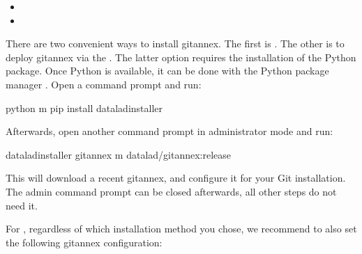 \begin{description}
\begin{itemize}
\item {} 
\sphinxAtStartPar
{}

\item {} 
\sphinxAtStartPar
{}

\end{itemize}

\ignorespaces 
\sphinxAtStartPar
There are two convenient ways to install git\sphinxhyphen{}annex. The first is . The other is to deploy git\sphinxhyphen{}annex via the .
The latter option requires the installation of the  Python package.
Once Python is available, it can be done with the Python package manager
. Open a command prompt and run:

\begin{sphinxVerbatim}[commandchars=\\\{\}]
 python \PYGZhy{}m pip install datalad\PYGZhy{}installer
\end{sphinxVerbatim}

\sphinxAtStartPar
Afterwards, open another command prompt in administrator mode and run:

\begin{sphinxVerbatim}[commandchars=\\\{\}]
 datalad\PYGZhy{}installer git\PYGZhy{}annex \PYGZhy{}m datalad/git\PYGZhy{}annex:release
\end{sphinxVerbatim}

\sphinxAtStartPar
This will download a recent git\sphinxhyphen{}annex, and configure it for your Git installation.
The admin command prompt can be closed afterwards, all other steps do not need it.

\sphinxAtStartPar
For , regardless of which installation method you chose, we recommend to also set the following git\sphinxhyphen{}annex configuration:


\end{description}
